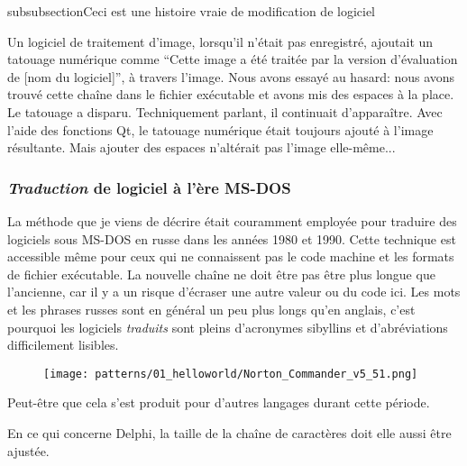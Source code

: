 subsubsection{Ceci est une histoire vraie de modification de logiciel}
\myindex{\SoftwareCracking}

Un logiciel de traitement d'image, lorsqu'il n'était pas enregistré, ajoutait un
tatouage numérique comme ``Cette image a été traitée par la version d'évaluation
de [nom du logiciel]'', à travers l'image.
Nous avons essayé au hasard: nous avons trouvé cette chaîne dans le fichier exécutable
et avons mis des espaces à la place.
Le tatouage a disparu.
Techniquement parlant, il continuait d'apparaître.
Avec l'aide des fonctions Qt, le tatouage numérique était toujours ajouté à l'image
résultante.
Mais ajouter des espaces n'altérait pas l'image elle-même...

\subsubsection{\emph{Traduction} de logiciel à l'ère MS-DOS}

La méthode que je viens de décrire était couramment employée pour traduire des logiciels sous MS-DOS en russe dans les
années 1980 et 1990.
Cette technique est accessible même pour ceux qui ne connaissent pas le code machine
et les formats de fichier exécutable.
La nouvelle chaîne ne doit être pas être plus longue que l'ancienne, car il y a un
risque d'écraser une autre valeur ou du code ici.
Les mots et les phrases russes sont en général un peu plus longs qu'en anglais, c'est pourquoi les logiciels
\emph{traduits} sont pleins d'acronymes sibyllins et d'abréviations difficilement lisibles.

\begin{figure}[H]
\centering
\texttt{[image: patterns/01\_helloworld/Norton\_Commander\_v5\_51.png]}
\caption{\FRph{}}
\end{figure}

Peut-être que cela s'est produit pour d'autres langages durant cette période.

En ce qui concerne Delphi, la taille de la chaîne de caractères doit elle aussi être ajustée.
